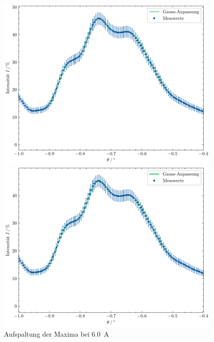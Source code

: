 \begin{figure}[h]
    \centering
    \begin{minipage}{0.45\linewidth}
        \centering
        \includegraphics[width=\linewidth]{../figs/gauss_i5.7.pdf}
        \caption{Aufspaltung der Maxima bei \SI{5.7}{\ampere}}
        \label{fig:gauss_i57}
    \end{minipage}
    \hspace{.5cm}
    \begin{minipage}{0.45\linewidth} 
        \centering
        \includegraphics[width=\linewidth]{../figs/gauss_i6.0.pdf}
        \caption{Aufspaltung der Maxima bei \SI{6.0}{\ampere}} 
        \label{fig:gauss_i60}
    \end{minipage}
\end{figure}


